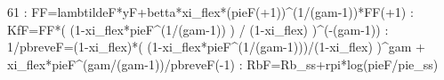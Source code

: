\documentclass{article}%
\begin{document}
61   :  FF=lambtildeF*yF+betta*xi\_flex*(pieF(+1))\^{}(1/(gam{-}1))*FF(+1)\newline%
   :  KfF=FF*( (1{-}xi\_flex*pieF\^{}(1/(gam{-}1)) ) / (1{-}xi\_flex) )\^{}({-}(gam{-}1))\newline%
   :  1/pbreveF=(1{-}xi\_flex)*( (1{-}xi\_flex*pieF\^{}(1/(gam{-}1)))/(1{-}xi\_flex) )\^{}gam + xi\_flex*pieF\^{}(gam/(gam{-}1))/pbreveF({-}1)\newline%
   :  RbF=Rb\_ss+rpi*log(pieF/pie\_ss)\newline%

%
\end{document}
